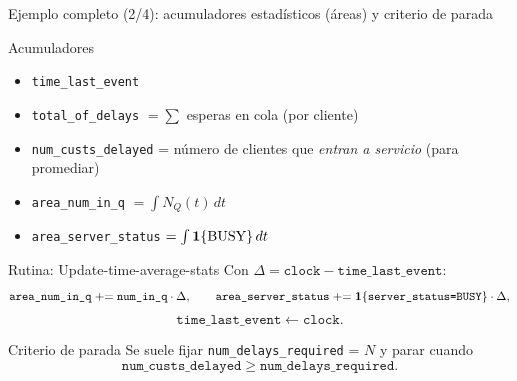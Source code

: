 \documentclass[aspectratio=1610, 9pt]{beamer}
\begin{document}
\begin{frame}[fragile]{Ejemplo completo (2/4): acumuladores estadísticos (áreas) y criterio de parada}
\small
\begin{block}{Acumuladores}
\begin{itemize}
\item \texttt{time\_last\_event}
\item \texttt{total\_of\_delays} $=\sum$ esperas en cola (por cliente)
\item \texttt{num\_custs\_delayed} = número de clientes que \emph{entran a servicio} (para promediar)
\item \texttt{area\_num\_in\_q} $=\int N_Q(t)\,dt$
\item \texttt{area\_server\_status} $=\int \mathbf{1}\{\text{BUSY}\}\,dt$
\end{itemize}
\end{block}

\vspace{2pt}
\begin{block}{Rutina: Update-time-average-stats }
Con $\Delta = \texttt{clock} - \texttt{time\_last\_event}$:
\[
\texttt{area\_num\_in\_q} \mathrel{+}= \texttt{num\_in\_q}\cdot \Delta,\qquad
\texttt{area\_server\_status} \mathrel{+}= \mathbf{1}\{\texttt{server\_status=BUSY}\}\cdot \Delta,
\]
\[
\texttt{time\_last\_event} \leftarrow \texttt{clock}.
\]
\end{block}

\vspace{2pt}
\begin{alertblock}{Criterio de parada }
Se suele fijar \texttt{num\_delays\_required} = $N$ y parar cuando
\[
\texttt{num\_custs\_delayed} \ge \texttt{num\_delays\_required}.
\]
\end{alertblock}
\end{frame}
\end{document}
